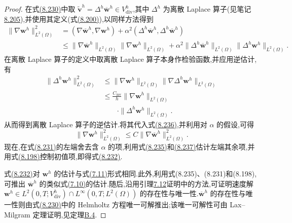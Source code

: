 \begin{lemma}
\begin{proof}
在式\hyperref[eq:navier-stokes-alpha-fem-velocity-only]{(8.230)}中取
$\widetilde{\bm{v}}^h=\Delta^h\overline{\bm{w}}^h\in V_{\mathrm{div}}^h$,其中 $\Delta^h$ 为离散 Laplace 算子(见笔记\hyperref[note:navier-stokes-alpha-discrete-filter-properties]{8.205}),并使用其定义(式\hyperref[eq:leray-alpha-discrete-laplacian]{(8.200)}),以同样方法得到
\begin{equation}\label{eq:navier-stokes-alpha-fem-gradient-bound-start}
\begin{aligned}
 \|\nabla\bm{w}^h\|_{L^2(\Omega)}^2
 &= (\nabla\overline{\bm{w}}^h,\nabla\bm{w}^h)
   +\alpha^2(\Delta^h\overline{\bm{w}}^h,
             \Delta^h\overline{\bm{w}}^h)\\
 &\le \|\nabla\overline{\bm{w}}^h\|_{L^2(\Omega)}
       \|\nabla\bm{w}^h\|_{L^2(\Omega)}
   +\alpha^2\|\Delta^h\overline{\bm{w}}^h\|_{L^2(\Omega)}
       \|\Delta^h\bm{w}^h\|_{L^2(\Omega)}.
\end{aligned}
\end{equation}
在离散 Laplace 算子的定义中取离散 Laplace 算子本身作检验函数,并应用逆估计,有
 \[
 \begin{aligned}
 \|\Delta^h\bm{w}^h\|_{L^2(\Omega)}^2
  &\le \|\nabla\bm{w}^h\|_{L^2(\Omega)}
        \|\nabla\Delta^h\bm{w}^h\|_{L^2(\Omega)}\\
  &\le \frac{C_{\mathrm{inv}}}{h}
        \|\nabla\bm{w}^h\|_{L^2(\Omega)}\\
  &\qquad\cdot\|\Delta^h\bm{w}^h\|_{L^2(\Omega)}.
 \end{aligned}
 \]
从而得到离散 Laplace 算子的逆估计.将其代入式\hyperref[eq:navier-stokes-alpha-fem-gradient-bound-start]{(8.236)},并利用对 $\alpha$ 的假设,可得
\begin{equation}\label{eq:navier-stokes-alpha-fem-gradient-bound}
 \|\nabla\bm{w}^h\|_{L^2(\Omega)}^2
  \le C\|\nabla\overline{\bm{w}}^h\|_{L^2(\Omega)}^2.
\end{equation}
现在,在式\hyperref[eq:navier-stokes-alpha-fem-stability-filtered]{(8.231)}的左端舍去含 $\alpha$ 的项,利用式\hyperref[eq:navier-stokes-alpha-fem-filter-norm-bound]{(8.235)}和\hyperref[eq:navier-stokes-alpha-fem-gradient-bound]{(8.237)}估计左端其余项,并用式\hyperref[eq:leray-alpha-discrete-filter-L2-stability]{(8.198)}控制初值项,即得式\hyperref[eq:navier-stokes-alpha-fem-stability-unfiltered]{(8.232)}.

式\hyperref[eq:navier-stokes-alpha-fem-stability-unfiltered]{(8.232)}对 $\bm{w}^h$ 的估计与式\hyperref[eq:time-dependent-galerkin-estimate-energy]{(7.11)}形式相同.此外,利用式(8.235)、(8.231)和(8.198),可推出 $\overline{\bm{w}}^h$ 的类似式\hyperref[eq:time-dependent-galerkin-estimate-sup]{(7.10)}的估计.随后,沿用引理\hyperref[lem:time-dependent-galerkin-unique]{7.12}证明中的方法,可证明速度解
$\bm{w}^h\in L^2(0,T;V_{\mathrm{div}}^h)\cap L^\infty(0,T;L^2(\Omega))$ 的存在性与唯一性.$\overline{\bm{w}}^h$ 的存在性与唯一性则由式\hyperref[eq:navier-stokes-alpha-fem-velocity-only]{(8.230)}中的 Helmholtz 方程唯一可解推出;该唯一可解性可由 Lax--Milgram 定理证明,见定理\hyperref[thm:appendix-b-4]{B.4}.
\end{proof}
\end{lemma}

